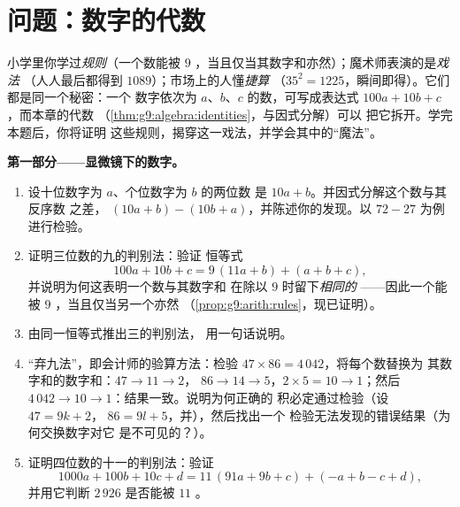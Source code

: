\section{问题：数字的代数}

\begin{problem}
\label{pb:g9:algebra:1}
小学里你学过\emph{规则}（一个数能被
$9$ ，当且仅当其数字和亦然）；魔术师表演的是\emph{戏法}
（人人最后都得到 $1089$）；市场上的人懂\emph{捷算}
（$35^2 = 1225$，瞬间即得）。它们都是同一个秘密：一个
数字依次为 $a$、$b$、$c$ 的数，可写成表达式
$100a + 10b + c$，而本章的代数
（\cref{thm:g9:algebra:identities}，与因式分解）可以
把它拆开。学完本题后，你将证明
这些规则，揭穿这一戏法，并学会其中的“魔法”。

\medskip
\noindent\textbf{第一部分——显微镜下的数字。}
\begin{enumerate}
  \item 设十位数字为 $a$、个位数字为 $b$ 的两位数
        是 $10a + b$。并因式分解这个数与其反序数
        之差，
        $(10a + b) - (10b + a)$，并陈述你的发现。以
        $72 - 27$ 为例进行检验。
  \item 证明三位数的九的判别法：验证
        恒等式
        \[
        100a + 10b + c = 9\,(11a + b) + (a + b + c),
        \]
        并说明为何这表明一个数与其数字和
        在除以 $9$ 时留下\emph{相同的}
——因此一个能被 $9$ ，当且仅当另一个亦然
        （\cref{prop:g9:arith:rules}，现已证明）。
  \item 由同一恒等式推出三的判别法，
        用一句话说明。
  \item “弃九法”，即会计师的验算方法：检验
        $47 \times 86 = 4\,042$，将每个数替换为
        其数字和的数字和：$47 \to 11 \to 2$，
        $86 \to 14 \to 5$，$2 \times 5 = 10 \to 1$；然后
        $4\,042 \to 10 \to 1$：结果一致。说明为何正确的
        积必定通过检验（设 $47 = 9k + 2$，
        $86 = 9l + 5$，并），然后找出一个
        检验无法发现的错误结果（为何交换数字对它
        是不可见的？）。
  \item 证明四位数的十一的判别法：验证
        \[
        1000a + 100b + 10c + d
        = 11\,(91a + 9b + c) + (- a + b - c + d),
        \]
        并用它判断 $2\,926$ 是否能被
        $11$ 。
\end{enumerate}


\end{problem}
